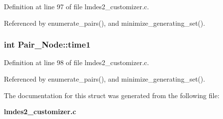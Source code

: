 Definition at line 97 of file lmdes2\_\-customizer.c.

Referenced by enumerate\_\-pairs(), and minimize\_\-generating\_\-set().
\subsubsection{\setlength{\rightskip}{0pt plus 5cm}int \bf{Pair\_\-Node::time1}}\label{structPair__Node_0794150083c96d6831c84db393e034c8}




Definition at line 98 of file lmdes2\_\-customizer.c.

Referenced by enumerate\_\-pairs(), and minimize\_\-generating\_\-set().

The documentation for this struct was generated from the following file:\begin{CompactItemize}
\item 
\bf{lmdes2\_\-customizer.c}\end{CompactItemize}
